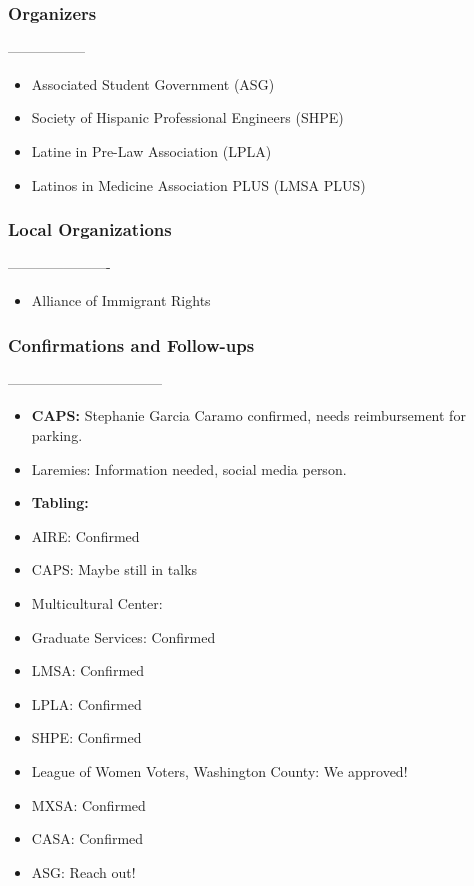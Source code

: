 \documentclass[11pt,a4paper]{article}
\begin{document}
\subsubsection*{Organizers}
-----------------

\begin{itemize}
  \item   Associated Student Government (ASG)
  \item   Society of Hispanic Professional Engineers (SHPE)
  \item   Latine in Pre-Law Association (LPLA)
  \item   Latinos in Medicine Association PLUS (LMSA PLUS)
\end{itemize}

\subsubsection*{Local Organizations}
----------------------

\begin{itemize}
  \item   Alliance of Immigrant Rights
\end{itemize}

\subsubsection*{Confirmations and Follow-ups}
---------------------------------

\begin{itemize}
  \item   \textbf{CAPS:} Stephanie Garcia Caramo confirmed, needs reimbursement for parking.
  \item   Laremies: Information needed, social media person.
  \item   \textbf{Tabling:}
  \item   AIRE: Confirmed
  \item   CAPS: Maybe still in talks
  \item   Multicultural Center:
  \item   Graduate Services: Confirmed
  \item   LMSA: Confirmed
  \item   LPLA: Confirmed
  \item   SHPE: Confirmed
  \item   League of Women Voters, Washington County: We approved!
  \item   MXSA: Confirmed
  \item   CASA: Confirmed
  \item   ASG: Reach out!
\end{itemize}
\end{document}

